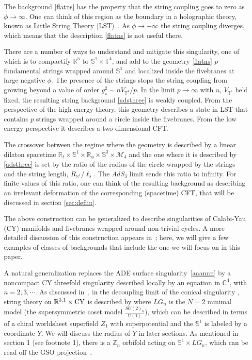 \documentclass[12pt]{article}
\def\sutwo{{SU(2)}}
\def\uone{U(1)}
\def\lstr{\ell_{\textit{s}}}
\newcommand{\bC}{{\mathbb C}}
\newcommand{\bR}{{\mathbb R}}
\newcommand{\bS}{{\mathbb S}}
\newcommand{\bT}{{\mathbb T}}
\newcommand{\bZ}{{\mathbb Z}}
\numberwithin{equation}{section}
\def\cM{\mathcal {M}} \def\cN{\mathcal {N}} \def\cO{\mathcal {O}}
\begin{document}
The background \eqref{flatns} has the property that the string coupling goes to zero as $\phi\to\infty$. One can think of this region as the boundary in a holographic theory, known as Little String Theory (LST)~. As $\phi\to-\infty$ the string coupling diverges, which means that the description \eqref{flatns} is not useful there. 

There are a number of ways to understand and mitigate this singularity, one of which is to compactify $\bR^5$ to $\bS^1\times \bT^4$, and add to the geometry \eqref{flatns} $p$ fundamental strings wrapped around $\bS^1$ and localized inside the fivebranes at large negative $\phi$. The presence of the strings stops the string coupling from growing beyond a value of order $g_s^2\sim n V_{\bT^4}/p$. In the limit $p\to\infty$ with $n$, $V_{\bT^4}$ held fixed, the resulting string background \eqref{adsthree} is weakly coupled. From the perspective of the high energy theory, this geometry describes a state in LST that contains $p$ strings wrapped around a circle inside the fivebranes. From the low energy perspective it describes a two dimensional CFT.  

The crossover between the regime where the geometry is described by a linear dilaton spacetime $\bR_t\times \bS^1\times\bR_\phi\times \bS^3\times\cM_4$ and the one where it is described by \eqref{adsthree} is set by the ratio of the radius of the circle wrapped by the strings and the string length, $R_{\bS^1}/\lstr$. The $AdS_3$ limit sends this ratio to infinity. For finite values of this ratio, one can think of the resulting background as describing an irrelevant deformation of the corresponding (spacetime) CFT, that will be discussed in section  \ref{sec:deflin}.

The above construction can be generalized to describe singularities of Calabi-Yau (CY) manifolds and fivebranes wrapped around non-trivial cycles. A more detailed discussion of this construction appears in~; here, we will give a few examples of classes of backgrounds that include the one we will focus on in this paper. 

A natural generalization replaces the ADE surface singularity~\eqref{aaannn} by a noncompact CY threefold singularity described locally by an equation in $\bC^4$, 
with $n=2,3,\cdots$. As discussed in~, in the decoupling limit of the conical singularity \bbbnnn, string theory on $\bR^{3,1}\times{\rm CY}$ is described by 
\eqn[ardoug]{\bR^{3,1}\times \bR_\phi\times \big( \bS^1\times LG_n \big)/\bZ_n~,}
where $LG_n$ is the $N=2$ minimal model (the supersymmetric coset model $\frac{\sutwo_n}{\uone}$), which can be described in terms of a chiral worldsheet superfield $Z_1$ with superpotential 
and the $\bS^1$ is labeled by a coordinate $Y$.  We will discuss the radius of $Y$ in later sections. As mentioned in section 1 (see footnote 1), there is a $\bZ_n$ orbifold acting on $\bS^1\times LG_n$, which can be read off the GSO projection~.
\end{document}
